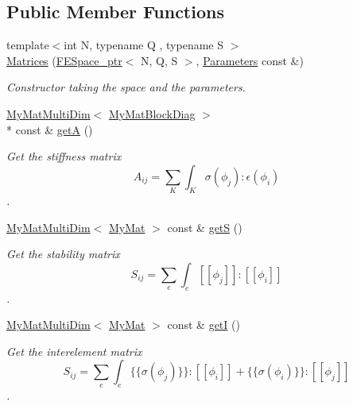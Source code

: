 \subsection*{Public Member Functions}
\begin{DoxyCompactItemize}
\item 
{\footnotesize template$<$int N, typename Q , typename S $>$ }\\\hyperlink{classTspeed_1_1Matrices_ad4b46e2f7a2056a6c5f3a803157236bc}{Matrices} (\hyperlink{namespaceTspeed_a05fcb57094666c8f5ab1e90d1a6fecf8}{F\-E\-Space\-\_\-ptr}$<$ N, Q, S $>$, \hyperlink{classTspeed_1_1Parameters}{Parameters} const \&)
\begin{DoxyCompactList}\small\item\em Constructor taking the space and the parameters. \end{DoxyCompactList}\item 
\hyperlink{classTspeed_1_1MyMatMultiDim}{My\-Mat\-Multi\-Dim}$<$ \hyperlink{classTspeed_1_1MyMatBlockDiag}{My\-Mat\-Block\-Diag} $>$\\*
 const \& \hyperlink{classTspeed_1_1Matrices_a4ee3310af2c6fa476099673ebf61c242}{get\-A} ()
\begin{DoxyCompactList}\small\item\em Get the stiffness matrix \[ A_{ij} = \sum_K \int_K \sigma(\phi_j):\epsilon(\phi_i) \]. \end{DoxyCompactList}\item 
\hyperlink{classTspeed_1_1MyMatMultiDim}{My\-Mat\-Multi\-Dim}$<$ \hyperlink{classTspeed_1_1MyMat}{My\-Mat} $>$ const \& \hyperlink{classTspeed_1_1Matrices_a95dfd802f178cf5dc51967ad70cf36cd}{get\-S} ()
\begin{DoxyCompactList}\small\item\em Get the stability matrix \[ S_{ij} = \sum_e \int_e [[\phi_j]] : [[\phi_i]] \]. \end{DoxyCompactList}\item 
\hyperlink{classTspeed_1_1MyMatMultiDim}{My\-Mat\-Multi\-Dim}$<$ \hyperlink{classTspeed_1_1MyMat}{My\-Mat} $>$ const \& \hyperlink{classTspeed_1_1Matrices_a78c435049af0aa48eacd9a9dc99627fa}{get\-I} ()
\begin{DoxyCompactList}\small\item\em Get the interelement matrix \[ S_{ij} = \sum_e \int_e \lbrace\lbrace\sigma(\phi_j)\rbrace\rbrace : [[\phi_i]] + \lbrace\lbrace\sigma(\phi_i)\rbrace\rbrace : [[\phi_j]] \]. \end{DoxyCompactList}\item 

\end{DoxyCompactItemize}
